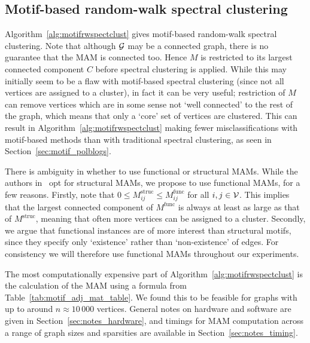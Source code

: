 \subsection{Motif-based random-walk spectral clustering} \label{sec:spectral_motifrwspectclust}

Algorithm~\ref{alg:motifrwspectclust} gives motif-based random-walk spectral clustering.
Note that although $\mathcal{G}$ may be a connected graph, there is no guarantee that the MAM is connected too.
Hence $M$ is restricted to its largest connected component $C$ before spectral clustering is applied.
While this may initially seem to be a flaw with motif-based spectral clustering (since not all vertices are assigned to a cluster), in fact it can be very useful; restriction of $M$ can remove vertices which are in some sense not `well connected' to the rest of the graph, which means that only a `core' set of vertices are clustered.
This can result in Algorithm~\ref{alg:motifrwspectclust} making fewer misclassifications with motif-based methods than with traditional spectral clustering, as seen in Section~\ref{sec:motif_polblogs}.

There is ambiguity in whether to use functional or structural MAMs.
While the authors in~\cite{benson2016higher} opt for structural MAMs, we propose to use functional MAMs, for a few reasons.
Firstly, note that $ 0 \leq M^\mathrm{struc}_{ij} \leq M^\mathrm{func}_{ij}$ for all $i,j \in \mathcal{V}$.
This implies that the largest connected component of $M^\mathrm{func}$ is always at least as large as that of $M^\mathrm{struc}$, meaning that often more vertices can be assigned to a cluster.
Secondly, we argue that functional instances are of more interest than structural motifs, since they specify only `existence' rather than `non-existence' of edges.
For consistency we will therefore use functional MAMs throughout our experiments.

The most computationally expensive part of Algorithm~\ref{alg:motifrwspectclust} is the calculation of the MAM using a formula from Table~\ref{tab:motif_adj_mat_table}. We found this to be feasible for graphs with up to around $n \approx 10 \, 000$ vertices. General notes on hardware and software are given in Section~\ref{sec:notes_hardware}, and timings for MAM computation across a range of graph sizes and sparsities are available in Section~\ref{sec:notes_timing}.





